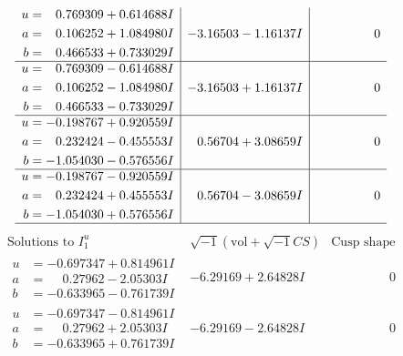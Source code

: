\documentclass[1p]{elsarticle_modified}
\theoremstyle{definition}
\newcommand{\I}{\sqrt{-1}}
\begin{document}
$$\begin{array}{c|c|c}
\begin{aligned}
u &= \phantom{-}0.769309 + 0.614688 I \\
a &= \phantom{-}0.106252 + 1.084980 I \\
b &= \phantom{-}0.466533 + 0.733029 I\end{aligned}
 & -3.16503 - 1.16137 I & \phantom{-0.000000 } 0 \\ \hline\begin{aligned}
u &= \phantom{-}0.769309 - 0.614688 I \\
a &= \phantom{-}0.106252 - 1.084980 I \\
b &= \phantom{-}0.466533 - 0.733029 I\end{aligned}
 & -3.16503 + 1.16137 I & \phantom{-0.000000 } 0 \\ \hline\begin{aligned}
u &= -0.198767 + 0.920559 I \\
a &= \phantom{-}0.232424 - 0.455553 I \\
b &= -1.054030 - 0.576556 I\end{aligned}
 & \phantom{-}0.56704 + 3.08659 I & \phantom{-0.000000 } 0 \\ \hline\begin{aligned}
u &= -0.198767 - 0.920559 I \\
a &= \phantom{-}0.232424 + 0.455553 I \\
b &= -1.054030 + 0.576556 I\end{aligned}
 & \phantom{-}0.56704 - 3.08659 I & \phantom{-0.000000 } 0\\
 \hline 
 \end{array}$$\newpage$$\begin{array}{c|c|c}  
\text{Solutions to }I^u_{1}& \I (\text{vol} + \sqrt{-1}CS) & \text{Cusp shape}\\
 \hline 
\begin{aligned}
u &= -0.697347 + 0.814961 I \\
a &= \phantom{-}0.27962 - 2.05303 I \\
b &= -0.633965 - 0.761739 I\end{aligned}
 & -6.29169 + 2.64828 I & \phantom{-0.000000 } 0 \\ \hline\begin{aligned}
u &= -0.697347 - 0.814961 I \\
a &= \phantom{-}0.27962 + 2.05303 I \\
b &= -0.633965 + 0.761739 I\end{aligned}
 & -6.29169 - 2.64828 I & \phantom{-0.000000 } 0 \\ \hline\begin{aligned}

\end{aligned}
\end{array}$$
\end{document}
